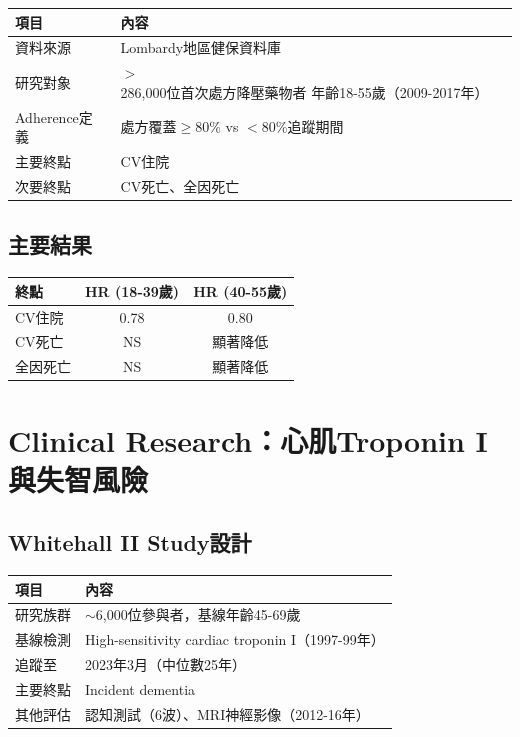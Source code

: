 \documentclass[12pt,a4paper]{article}
\begin{document}
\begin{longtable}{p{4cm}p{10cm}}
\toprule
\textbf{項目} & \textbf{內容} \\
\midrule
\endfirsthead
\bottomrule
\endfoot

資料來源 & Lombardy地區健保資料庫 \\
\midrule
研究對象 & $>$286,000位首次處方降壓藥物者\newline
年齡18-55歲（2009-2017年） \\
\midrule
Adherence定義 & 處方覆蓋$\geq$80\% vs $<$80\%追蹤期間 \\
\midrule
主要終點 & CV住院 \\
\midrule
次要終點 & CV死亡、全因死亡 \\
\bottomrule
\end{longtable}

\subsection{主要結果}

\begin{longtable}{lcc}
\toprule
\textbf{終點} & \textbf{HR (18-39歲)} & \textbf{HR (40-55歲)} \\
\midrule
\endfirsthead
\bottomrule
\endfoot

CV住院 & 0.78 & 0.80 \\
CV死亡 & NS & 顯著降低 \\
全因死亡 & NS & 顯著降低 \\
\bottomrule
\end{longtable}


\section{Clinical Research：心肌Troponin I與失智風險}

\subsection{Whitehall II Study設計}

\begin{longtable}{p{4cm}p{10cm}}
\toprule
\textbf{項目} & \textbf{內容} \\
\midrule
\endfirsthead
\bottomrule
\endfoot

研究族群 & $\sim$6,000位參與者，基線年齡45-69歲 \\
\midrule
基線檢測 & High-sensitivity cardiac troponin I（1997-99年） \\
\midrule
追蹤至 & 2023年3月（中位數25年） \\
\midrule
主要終點 & Incident dementia \\
\midrule
其他評估 & 認知測試（6波）、MRI神經影像（2012-16年） \\
\bottomrule
\end{longtable}
\end{document}
